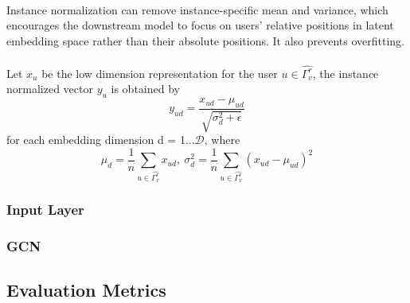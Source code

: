 \paragraph{} Instance normalization can remove instance-specific mean and variance, which encourages the downstream model 
to focus on users’ relative positions in latent embedding space rather than their absolute positions. It also prevents 
overfitting.
\paragraph{} Let $x_u$ be the low dimension representation for the user $u \in \hat{\Gamma_v^r}$, the instance normalized
vector $y_u$ is obtained by
\begin{equation}
    y_{ud} = \frac{x_{ud}-\mu_{ud}}{\sqrt{\sigma_d^2+\epsilon}}
\end{equation}
for each embedding dimension d = 1...$\mathcal{D}$, where
\begin{equation}
    \mu_d = \frac{1}{n}\sum_{u \in \hat{\Gamma_v^r}}x_{ud},\ \sigma_d^2 = \frac{1}{n}\sum_{u \in \hat{\Gamma_v^r}}(x_{ud}-\mu_{ud})^2
\end{equation}
\subsubsection{Input Layer}
\subsubsection{GCN}
\subsection{Evaluation Metrics}